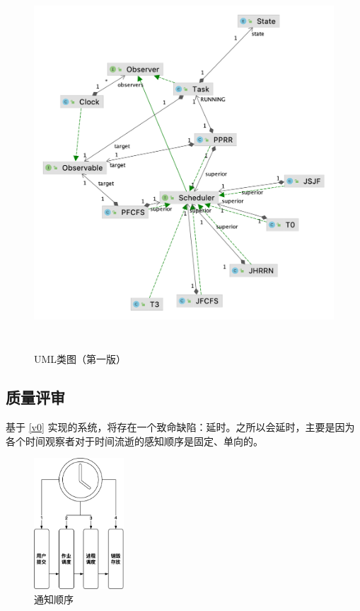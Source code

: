 \documentclass[UTF8]{ctexart}
\begin{document}
\begin{figure}[htbp]
    \centering
    \includegraphics[height=395pt]{v0-class-compat.png}
    \caption{UML类图（第一版）}
\end{figure}

\newpage

\newpage

\subsection{质量评审}

基于 \ref{v0} 实现的系统，将存在一个致命缺陷：延时。之所以会延时，主要是因为各个时间观察者对于时间流逝的感知顺序是固定、单向的。
\begin{figure}[htbp]
    \centering
    \includegraphics[height=13.2em]{i-lag.png}
    \caption{通知顺序}
\end{figure}
\end{document}

